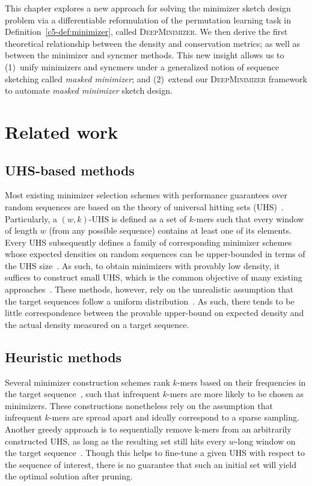 This chapter explores a new approach for solving the minimizer sketch design problem via a differentiable reformulation of the permutation learning task in Definition~\ref{c5-def:minimizer}, called \textsc{DeepMinimizer}. We then derive the first theoretical relationship between the density and conservation metrics; as well as between the minimizer and syncmer methods. This new insight allows us to (1)~unify minimizers and syncmers under a generalized notion of sequence sketching called \textit{masked minimizer}; and (2)~extend our \textsc{DeepMinimizer} framework to automate \textit{masked minimizer} sketch design.

\section{Related work}
\subsection{UHS-based methods} Most existing minimizer selection schemes with performance guarantees over random sequences are based on the theory of universal hitting sets (UHS)~\citep{marcais18,orenstein17}. Particularly, a $(w,k)$-UHS is defined as a set of $k$-mers such that every window of length $w$ (from any possible sequence) contains at least one of its elements. Every UHS subsequently defines a family of corresponding minimizer schemes whose expected densities on random sequences can be upper-bounded in terms of the UHS size~\citep{marcais17}. As such, to obtain minimizers with provably low density, it suffices to construct small UHS, which is the common objective of many existing approaches~\citep{marcais17,ekim20pasha,zheng20miniception}. These methods, however, rely on the unrealistic assumption that the target sequences follow a uniform distribution~\citep{zhang07}. As such, there tends to be little correspondence between the provable upper-bound on expected density and the actual density measured on a target sequence. 

\subsection{Heuristic methods} Several minimizer construction schemes rank $k$-mers based on their frequencies in the target sequence~\citep{chikhi16,jain20b}, such that infrequent $k$-mers are more likely to be chosen as minimizers. These constructions nonetheless rely on the assumption that infrequent $k$-mers are spread apart and ideally correspond to a sparse sampling. Another greedy approach is to sequentially remove k-mers from an arbitrarily constructed UHS, as long as the resulting set still hits every $w$-long window on the target sequence~\citep{deblasio19}. Though this helps to fine-tune a given UHS with respect to the sequence of interest, there is no guarantee that such an initial set will yield the optimal solution after pruning.

